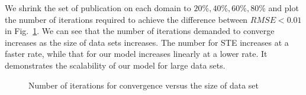 \documentclass{ieeeaccess}
\begin{document}
We shrink the  set of publication on each domain to $20\%,40\%,60\%,80\%$ and plot the number of iterations required to achieve the difference between $RMSE<0.01$ in Fig.~\ref{fig:convergence}. We can see that the number of iterations demanded to converge increases as the size of data sets increases. The number for STE increases at a faster rate, while that for our model increases linearly at a lower rate. It demonstrates the scalability of our model for large data sets.

\begin{figure}[htbp]
\centering
{}
\end{figure}
\begin{figure}[htbp]
\centering
{}
\caption{Number of iterations for convergence versus the size of data set}
\label{fig:convergence}
\end{figure}
\end{document}
